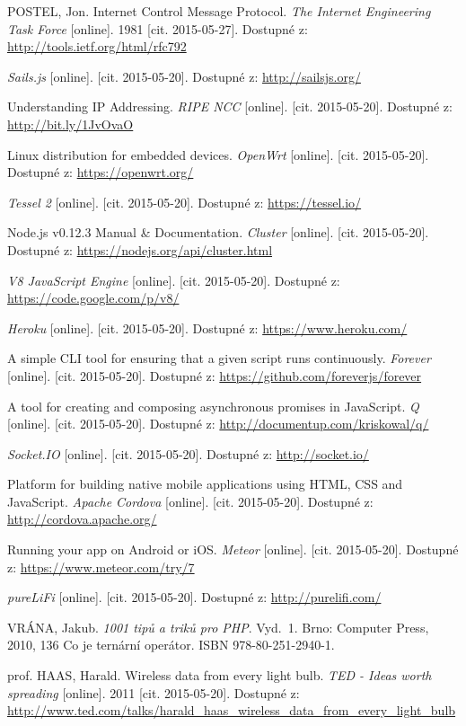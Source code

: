 \documentclass[oneside,12pt,a4paper,draft]{book} %
\begin{document}
\begin{thebibliography}{99}
POSTEL, Jon. Internet Control Message Protocol. \textit{The Internet Engineering Task Force} [online]. 1981 [cit. 2015-05-27]. Dostupné z: \url{http://tools.ietf.org/html/rfc792}

\textit{Sails.js} [online]. [cit. 2015-05-20]. Dostupné z: \url{http://sailsjs.org/}

Understanding IP Addressing. \textit{RIPE NCC} [online]. [cit. 2015-05-20]. Dostupné z: \url{http://bit.ly/1JvOvaO}

Linux distribution for embedded devices. \textit{OpenWrt} [online]. [cit. 2015-05-20]. Dostupné z: \url{https://openwrt.org/}

\textit{Tessel 2} [online]. [cit. 2015-05-20]. Dostupné z: \url{https://tessel.io/}

Node.js v0.12.3 Manual \& Documentation. \textit{Cluster} [online]. [cit. 2015-05-20]. Dostupné z: \url{https://nodejs.org/api/cluster.html}

\textit{V8 JavaScript Engine} [online]. [cit. 2015-05-20]. Dostupné z: \url{https://code.google.com/p/v8/}

\textit{Heroku} [online]. [cit. 2015-05-20]. Dostupné z: \url{https://www.heroku.com/}

A simple CLI tool for ensuring that a given script runs continuously. \textit{Forever} [online]. [cit. 2015-05-20]. Dostupné z: \url{https://github.com/foreverjs/forever}

A tool for creating and composing asynchronous promises in JavaScript. \textit{Q} [online]. [cit. 2015-05-20]. Dostupné z: \url{http://documentup.com/kriskowal/q/}

\textit{Socket.IO} [online]. [cit. 2015-05-20]. Dostupné z: \url{http://socket.io/}

Platform for building native mobile applications using HTML, CSS and JavaScript. \textit{Apache Cordova} [online]. [cit. 2015-05-20]. Dostupné z: \url{http://cordova.apache.org/}

Running your app on Android or iOS. \textit{Meteor} [online]. [cit. 2015-05-20]. Dostupné z: \url{https://www.meteor.com/try/7}

\textit{pureLiFi} [online]. [cit. 2015-05-20]. Dostupné z: \url{http://purelifi.com/}

VRÁNA, Jakub. \textit{1001 tipů a triků pro PHP}. Vyd.~1. Brno: Computer Press, 2010, 136 Co je ternární operátor. ISBN 978-80-251-2940-1.

prof. HAAS, Harald. Wireless data from every light bulb. \textit{TED - Ideas worth spreading} [online]. 2011 [cit. 2015-05-20]. Dostupné z: \url{http://www.ted.com/talks/harald_haas_wireless_data_from_every_light_bulb}

\end{thebibliography}

\printindex
\end{document}
